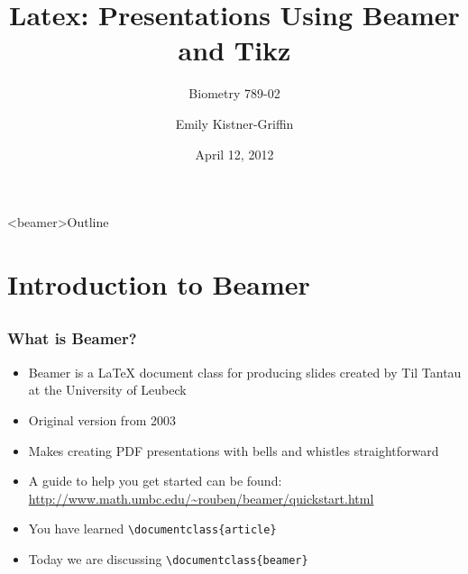 \documentclass{beamer}
\title[LaTeX:Presentations]{Latex: Presentations Using Beamer and Tikz}
\subtitle[]{Biometry 789-02}
\author{Emily Kistner-Griffin}
\date{April 12, 2012}
\institute[MUSC]{}
\begin{document}
\begin{frame}
\titlepage
\end{frame}

{
  \begin{frame}<beamer>{Outline}
    \tableofcontents[pausesections]
  \end{frame}
}

\section{Introduction to Beamer}
\subsection{}
\begin{frame}[fragile]
  \frametitle{What is Beamer?}
  \begin{itemize}
  \item Beamer is a LaTeX document class for producing slides created by Til Tantau at the University of Leubeck
  \item Original version from 2003
  \item Makes creating PDF presentations with bells and whistles straightforward
  \item A guide to help you get started can be found: \url{http://www.math.umbc.edu/~rouben/beamer/quickstart.html}
  \item You have learned \verb|\documentclass{article}|
  \item Today we are discussing \verb|\documentclass{beamer}|
   \end{itemize}
\end{frame}

\end{document}
